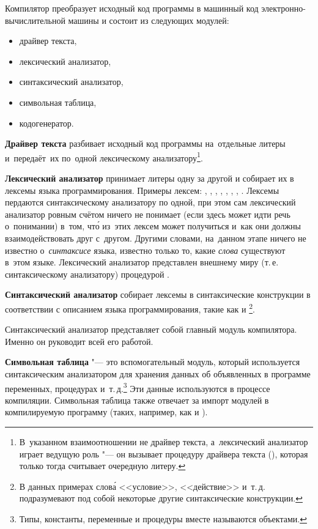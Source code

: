 Компилятор преобразует исходный код программы в машинный код
электронно-вычислительной машины и состоит из следующих модулей:

\begin{itemize}
  \item драйвер текста,
  \item лексический анализатор,
  \item синтаксический анализатор,
  \item символьная таблица,
  \item кодогенератор.
\end{itemize}

{\bfseries Драйвер текста} разбивает исходный код программы
на~отдельные литеры и~передаёт~их по~одной лексическому
анализатору\footnote{В~указанном взаимоотношении не драйвер
текста, а~лексический анализатор играет ведущую роль "--- он
вызывает процедуру драйвера текста (), которая
только тогда считывает очередную литеру.}.

{\bfseries Лексический анализатор} принимает литеры одну за другой
и собирает их в лексемы языка программирования. Примеры лексем:
, , \kod{+}, \kod{:=}, ,
, \kod{>=}, .
Лексемы пердаются синтаксическому анализатору по одной, при этом сам
лексический анализатор ровным счётом ничего не понимает (если здесь
может идти речь о~понимании) в~том, чт\'{о}
из~этих лексем может получиться и~как они должны взаимодействовать
друг с~другом. Другими словами, на~данном этапе ничего не известно
о~{\em синтаксисе} языка, известно только то, какие {\em слова}
существуют в~этом языке.
Лексический анализатор представлен внешнему миру
(т.\,е.\,синтаксическому анализатору) процедурой .

{\bfseries Синтаксический анализатор} собирает лексемы в синтаксические
конструкции в соответствии с описанием языка программирования,
такие как  и
\footnote{В данных примерах слов\'{а}
<<условие>>, <<действие>> и~т.\,д. подразумевают под собой некоторые
другие синтаксические конструкции.}.

Синтаксический анализатор представляет собой главный модуль компилятора.
Именно он руководит всей его работой.

{\bfseries Символьная таблица} "--- это вспомогательный модуль, который
используется синтаксическим анализатором для хранения данных об
объявленных в программе переменных, процедурах и~т.\,д.\footnote{Типы,
константы, переменные и процедуры вместе называются объектами.}
Эти данные используются в процессе компиляции. Символьная таблица также
отвечает за импорт модулей в компилируемую программу (таких, например,
как  и ).

